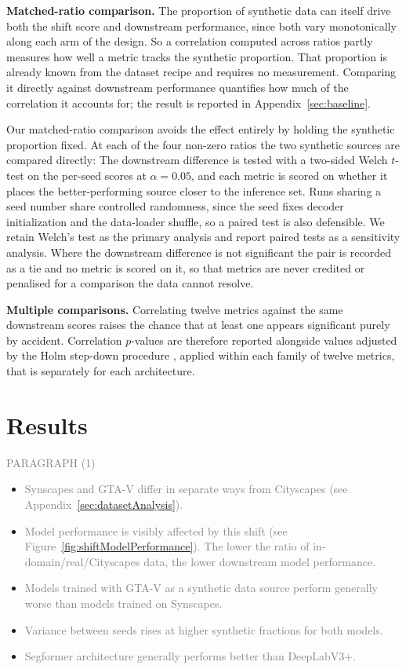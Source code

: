 \documentclass[conference]{IEEEtran}
\begin{document}
\textbf{Matched-ratio comparison.} The proportion of synthetic data can itself drive both the shift score and downstream performance, since both vary monotonically along each arm of the design. So a correlation computed across ratios partly measures how well a metric tracks the synthetic proportion. That proportion is already known from the dataset recipe and requires no measurement. Comparing it directly against downstream performance quantifies how much of the correlation it accounts for; the result is reported in Appendix~\ref{sec:baseline}.

Our matched-ratio comparison avoids the effect entirely by holding the synthetic proportion fixed. At each of the four non-zero ratios the two synthetic sources are compared directly: The downstream difference is tested with a two-sided Welch $t$-test on the per-seed scores at $\alpha = 0.05$, and each metric is scored on whether it places the better-performing source closer to the inference set. Runs sharing a seed number share controlled randomness, since the seed fixes decoder initialization and the data-loader shuffle, so a paired test is also defensible. We retain Welch's test as the primary analysis and report paired tests as a sensitivity analysis. Where the downstream difference is not significant the pair is recorded as a tie and no metric is scored on it, so that metrics are never credited or penalised for a comparison the data cannot resolve.

\textbf{Multiple comparisons.} Correlating twelve metrics against the same downstream scores raises the chance that at least one appears significant purely by accident. Correlation $p$-values are therefore reported alongside values adjusted by the Holm step-down procedure \cite{holm1979}, applied within each family of twelve metrics, that is separately for each architecture.

\section{Results}
\textcolor{gray}{PARAGRAPH (1)}

\begin{itemize}
    \item \textcolor{gray}{Synscapes and GTA-V differ in separate ways from Cityscapes (see Appendix~\ref{sec:datasetAnalysis}).}
    \item \textcolor{gray}{Model performance is visibly affected by this shift (see Figure~\ref{fig:shiftModelPerformance}). The lower the ratio of in-domain/real/Cityscapes data, the lower downstream model performance.}
    \item \textcolor{gray}{Models trained with GTA-V as a synthetic data source perform generally worse than models trained on Synscapes.}
    \item \textcolor{gray}{Variance between seeds rises at higher synthetic fractions for both models.}
    \item \textcolor{gray}{Segformer architecture generally performs better than DeepLabV3+.}
\end{itemize}
\end{document}
